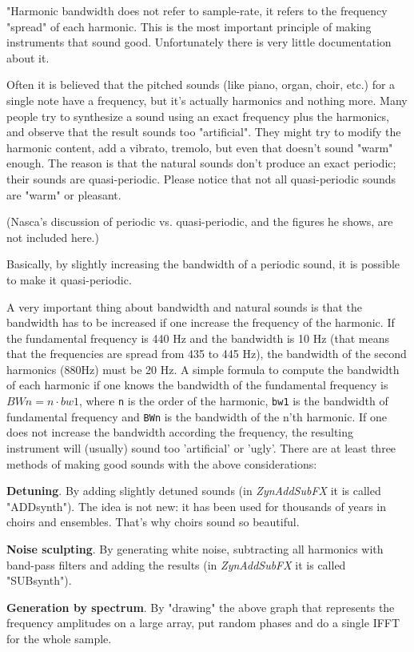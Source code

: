    "Harmonic bandwidth does not refer to sample-rate, it refers to the
   frequency "spread" of each harmonic. This is the most important principle
   of making instruments that sound good. Unfortunately there is very little
   documentation about it.
    
   Often it is believed that the pitched sounds (like piano, organ, choir,
   etc.) for a single note have a frequency, but it's actually
   harmonics and nothing more. Many people try to synthesize a sound using an
   exact frequency plus the harmonics, and observe that the result sounds too
   "artificial".  They might try to modify the harmonic content, add a
   vibrato, tremolo, but even that doesn't sound "warm" enough. The reason is
   that the natural sounds don't produce an exact periodic; their sounds are
   quasi-periodic.  Please notice that not all quasi-periodic sounds are
   "warm" or pleasant.
   
   (Nasca's discussion of periodic vs. quasi-periodic,
   and the figures he shows, are not included here.)
   
   Basically, by slightly increasing the bandwidth of a periodic sound, it
   is possible to make it quasi-periodic.

   A very important thing about bandwidth and natural sounds is that the
   bandwidth has to be increased if one increase the frequency of the
   harmonic.  If the fundamental frequency is 440 Hz and the bandwidth is 10
   Hz (that means that the frequencies are spread from 435 to 445 Hz), the
   bandwidth of the second harmonics (880Hz) must be 20 Hz. A simple formula
   to compute the bandwidth of each harmonic if one knows the bandwidth of the
   fundamental frequency is \(BWn = n⋅bw1\), where \texttt{n} is the
   order of the harmonic, \texttt{bw1} is the bandwidth of fundamental
   frequency and \texttt{BWn} is the bandwidth of the n'th harmonic. If one
   does not increase the bandwidth according the frequency, the resulting
   instrument will (usually) sound too 'artificial' or 'ugly'.  There
   are at least three methods of making good sounds with the above
   considerations: 

   \begin{enumber}
      \item \textbf{Detuning}.
      By adding slightly detuned sounds (in \textsl{ZynAddSubFX}
      it is called "ADDsynth"). The idea is not new: it has been used
      for thousands of years in choirs and ensembles. That's why choirs
      sound so beautiful.
      \item \textbf{Noise sculpting}.
      By generating white noise, subtracting all harmonics with band-pass
      filters and adding the results (in \textsl{ZynAddSubFX}
      it is called "SUBsynth").
      \item \textbf{Generation by spectrum}.
      By "drawing" the above graph that represents the frequency
      amplitudes on a large array, put random phases and do a single
      IFFT for the whole sample.
   \end{enumber}

